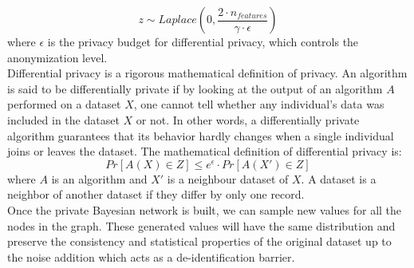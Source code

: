 \begin{equation*}
    z \sim Laplace \left(0, \frac{2 \cdot n_{features}}{\gamma \cdot \epsilon} \right)
\end{equation*}
where $\epsilon$ is the privacy budget for differential privacy, which controls the anonymization level. \\
Differential privacy is a rigorous mathematical definition of privacy. An algorithm is said to be differentially private if by looking at the output of an algorithm $A$ performed on a dataset $X$, one cannot tell whether any individual's data was included in the dataset $X$ or not. In other words, a differentially private algorithm guarantees that its behavior hardly changes when a single individual joins or leaves the dataset.
The mathematical definition of differential privacy is:
\begin{equation*}
    Pr[A(X) \in Z] \leq e^{\epsilon} \cdot Pr[A(X') \in Z]
\end{equation*}
where $A$ is an algorithm and $X'$ is a neighbour dataset of $X$. A dataset is a neighbor of another dataset if they differ by only one record. \\ 
Once the private Bayesian network is built, we can sample new values for all the nodes in the graph. These generated values will have the same distribution and preserve the consistency and statistical properties of the original dataset up to the noise addition which acts as a de-identification barrier. 

